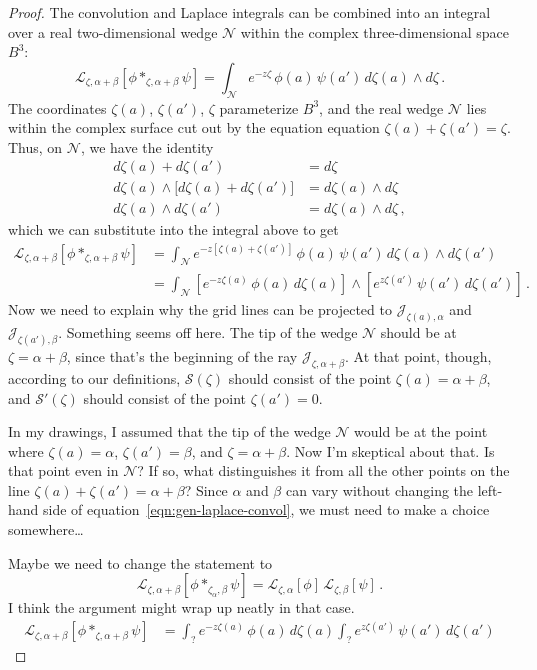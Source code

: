 \documentclass{article}
\newcommand{\laplace}{\mathcal{L}}
\theoremstyle{definition}
\theoremstyle{plain}
\newenvironment{todo}{\color{Coral}}{\color{black}}
\newenvironment{draft}{\color{SlateBlue}}{\color{black}}
\begin{document}
\begin{proof}
\begin{draft}
The convolution and Laplace integrals can be combined into an integral over a real two-dimensional wedge $\mathcal{N}$ within the complex three-dimensional space $B^3$:
\[ \laplace_{\zeta,\alpha+\beta}[{\phi}\ast_{\zeta, \alpha+\beta}{\psi}] = \int_\mathcal{N} e^{-z\zeta}\,\phi(a)\, \psi(a')\,d\zeta(a) \wedge d\zeta\,. \]
The coordinates $\zeta(a)$, $\zeta(a')$, $\zeta$ parameterize $B^3$, and the real wedge $\mathcal{N}$ lies within the complex surface cut out by the equation equation $\zeta(a) + \zeta(a') = \zeta$. Thus, on $\mathcal{N}$, we have the identity
\begin{align*}
d\zeta(a) + d\zeta(a') & = d\zeta \\
d\zeta(a) \wedge \big[d\zeta(a) + d\zeta(a')\big] & = d\zeta(a) \wedge d\zeta \\
d\zeta(a) \wedge d\zeta(a') & = d\zeta(a) \wedge d\zeta\,,
\end{align*}
which we can substitute into the integral above to get
\begin{align*}
\laplace_{\zeta,\alpha+\beta}[{\phi}\ast_{\zeta, \alpha+\beta}{\psi}] & = \int_\mathcal{N} e^{-z[\zeta(a) + \zeta(a')]}\,\phi(a)\, \psi(a')\,d\zeta(a) \wedge d\zeta(a') \\
& = \int_\mathcal{N} \left[ e^{-z\zeta(a)}\,\phi(a)\,d\zeta(a) \right] \wedge \left[ e^{z\zeta(a')}\,\psi(a')\,d\zeta(a') \right]\,.
\end{align*}
\begin{todo}Now we need to explain why the grid lines can be projected to $\mathcal{J}_{\zeta(a), \alpha}$ and $\mathcal{J}_{\zeta(a'), \beta}$. Something seems off here. The tip of the wedge $\mathcal{N}$ should be at $\zeta = \alpha + \beta$, since that's the beginning of the ray $\mathcal{J}_{\zeta, \alpha + \beta}$. At that point, though, according to our definitions, $\mathcal{S}(\zeta)$ should consist of the point $\zeta(a) = \alpha + \beta$, and $\mathcal{S}'(\zeta)$ should consist of the point $\zeta(a') = 0$.

In my drawings, I assumed that the tip of the wedge $\mathcal{N}$ would be at the point where $\zeta(a) = \alpha$, $\zeta(a') = \beta$, and $\zeta = \alpha + \beta$. Now I'm skeptical about that. Is that point even in $\mathcal{N}$? If so, what distinguishes it from all the other points on the line $\zeta(a) + \zeta(a') = \alpha + \beta$? Since $\alpha$ and $\beta$ can vary without changing the left-hand side of equation~\eqref{eqn:gen-laplace-convol}, we must need to make a choice somewhere\ldots

Maybe we need to change the statement to
\[ \laplace_{\zeta,\alpha+\beta}[\phi \ast_{\zeta_\alpha, \beta} \psi] = \laplace_{\zeta,\alpha}[\phi]\,\laplace_{\zeta,\beta}[\psi]\,. \]
I think the argument might wrap up neatly in that case.
\end{todo}
\begin{align*}
\laplace_{\zeta,\alpha+\beta}[{\phi}\ast_{\zeta, \alpha+\beta}{\psi}] & = \int_{?} e^{-z\zeta(a)}\,\phi(a)\,d\zeta(a) \int_{?} e^{z\zeta(a')}\,\psi(a')\,d\zeta(a')
\end{align*}
\end{draft}


\end{proof}
\end{document}
